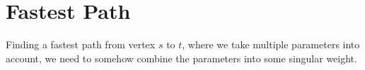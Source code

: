 \section{Fastest Path}
Finding a fastest path from vertex $s$ to $t$, where we take multiple parameters into account, we need to somehow combine the parameters into some singular weight.